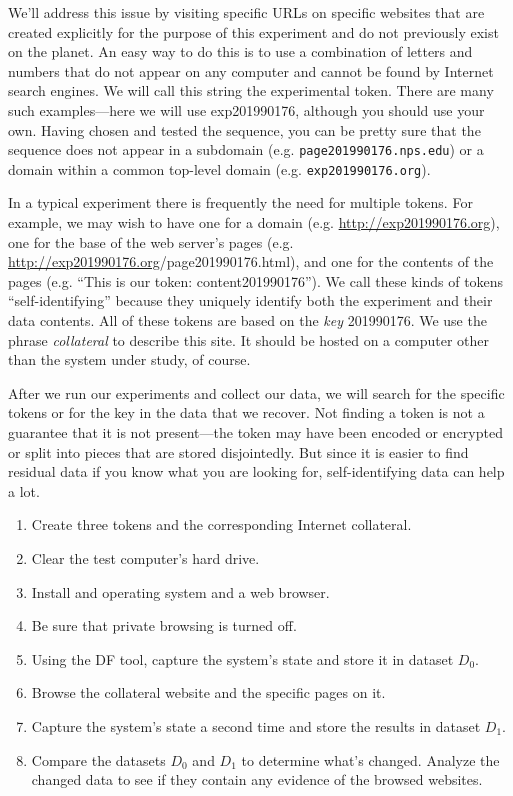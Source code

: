 We'll address this issue by visiting specific URLs on specific
websites that are created explicitly for the purpose of this
experiment and do not previously exist on the planet. 
An easy way to do this is to use a combination of letters and
numbers that do not appear on any computer and cannot be found by
Internet search engines. We will call this string the experimental
token. There are many such examples---here we will
use exp201990176, although you should use your own. Having chosen and
tested the sequence, you can be pretty sure that the sequence does not
appear in a subdomain (e.g. \texttt{page201990176.nps.edu}) or a domain
  within a common top-level domain (e.g. \texttt{exp201990176.org}).

In a typical experiment there is frequently the need for multiple
tokens. For example, we may wish to have one for a domain
(e.g. \url{http://exp201990176.org}), one for the base of the web
server's pages
(e.g. \url{http://exp201990176.org}/page201990176.html), and one for
the contents of the pages (e.g. ``This is our token:
  content201990176'').  We call these kinds of tokens
  ``self-identifying'' because they uniquely identify both the
  experiment and their data contents. All of these tokens are based on
  the \emph{key} 201990176. We use the phrase
  \emph{collateral} to describe this site. It should be hosted on a
 computer other than the system under study, of course.

After we run our experiments and collect our data, we will search for
the specific tokens or for the key in the data that we recover. Not
finding a token is not a guarantee that it is not present---the token
may have been encoded or encrypted or split into pieces that are
stored disjointedly. But since it is easier to find residual data if
you know what you are looking for, self-identifying data can help a
lot.

\label{protocol:background}
\begin{enumerate}
\item Create three tokens and the corresponding Internet collateral.
\item Clear the test computer's hard drive.
\item Install and operating system and a web browser.
\item Be sure that private browsing is turned off.
\item Using the DF tool, capture the system's state and store it in dataset $D_0$.
\item Browse the collateral website
 and the specific pages on it.
\item Capture the system's state a second time and store the results in dataset $D_1$.
\item Compare the datasets $D_0$ and $D_1$ to determine what's
  changed. Analyze the changed data to see if they contain any
  evidence of the browsed websites. 
\end{enumerate}


